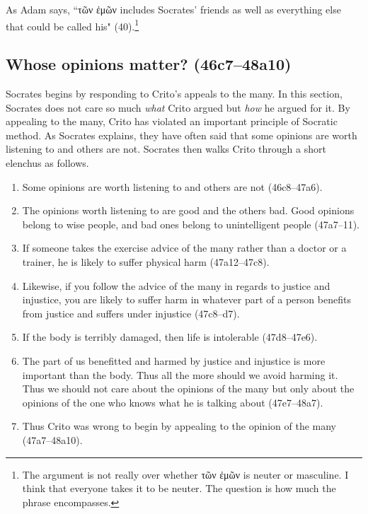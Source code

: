 \documentclass[12pt,letterpaper]{article}
\begin{document}
As Adam says, ``\textgreek{τῶν ἐμῶν} includes Socrates' friends as well as everything else that could be called his" (40).\footnote{The argument is not really over whether \textgreek{τῶν ἐμῶν} is neuter or masculine. I think that everyone takes it to be neuter. The question is how much the phrase encompasses.}


\subsection*{Whose opinions matter? (46c7--48a10)}

Socrates begins by responding to Crito's appeals to the many. In this section, Socrates does not care so much \emph{what} Crito argued but \emph{how} he argued for it. By appealing to the many, Crito has violated an important principle of Socratic method. As Socrates explains, they have often said that some opinions are worth listening to and others are not. Socrates then walks Crito through a short elenchus as follows.

\begin{enumerate}

    \item Some opinions are worth listening to and others are not (46c8--47a6).

    \item The opinions worth listening to are good and the others bad. Good opinions belong to wise people, and bad ones belong to unintelligent people (47a7--11).

    \item If someone takes the exercise advice of the many rather than a doctor or a trainer, he is likely to suffer physical harm (47a12--47c8).

    \item Likewise, if you follow the advice of the many in regards to justice and injustice, you are likely to suffer harm in whatever part of a person benefits from justice and suffers under injustice (47c8--d7).

    \item If the body is terribly damaged, then life is intolerable (47d8--47e6).

    \item The part of us benefitted and harmed by justice and injustice is more important than the body. Thus all the more should we avoid harming it. Thus we should not care about the opinions of the many but only about the opinions of the one who knows what he is talking about (47e7--48a7).

    \item Thus Crito was wrong to begin by appealing to the opinion of the many (47a7--48a10).

\end{enumerate}
\end{document}
